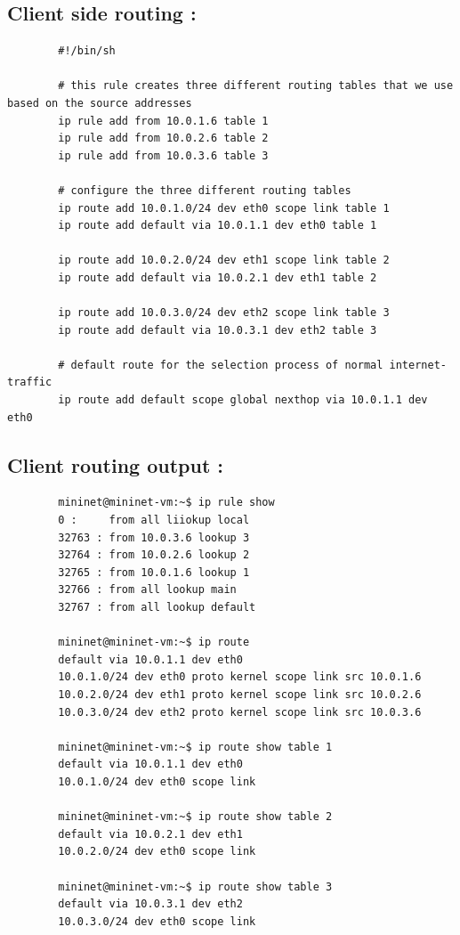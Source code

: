 \documentclass[a4paper,11pt]{article}
\begin{document}
	 	\subsection{Client side routing :}
	 	\label{subsec:clientroute}
	 	\begin{lstlisting}
	 	#!/bin/sh

	 	# this rule creates three different routing tables that we use based on the source addresses
	 	ip rule add from 10.0.1.6 table 1
	 	ip rule add from 10.0.2.6 table 2
	 	ip rule add from 10.0.3.6 table 3

	 	# configure the three different routing tables
	 	ip route add 10.0.1.0/24 dev eth0 scope link table 1
	 	ip route add default via 10.0.1.1 dev eth0 table 1

	 	ip route add 10.0.2.0/24 dev eth1 scope link table 2
	 	ip route add default via 10.0.2.1 dev eth1 table 2

	 	ip route add 10.0.3.0/24 dev eth2 scope link table 3
	 	ip route add default via 10.0.3.1 dev eth2 table 3

	 	# default route for the selection process of normal internet-traffic
	 	ip route add default scope global nexthop via 10.0.1.1 dev eth0
	 	\end{lstlisting}

	 	\subsection{Client routing output :}
	 	\label{subsec:clientrouteout}
	 	\begin{lstlisting}
	 	mininet@mininet-vm:~$ ip rule show
	 	0 : 	from all liiokup local
	 	32763 : from 10.0.3.6 lookup 3
	 	32764 : from 10.0.2.6 lookup 2
	 	32765 : from 10.0.1.6 lookup 1
	 	32766 : from all lookup main
	 	32767 : from all lookup default

	 	mininet@mininet-vm:~$ ip route
	 	default via 10.0.1.1 dev eth0
	 	10.0.1.0/24 dev eth0 proto kernel scope link src 10.0.1.6
	 	10.0.2.0/24 dev eth1 proto kernel scope link src 10.0.2.6
	 	10.0.3.0/24 dev eth2 proto kernel scope link src 10.0.3.6

	 	mininet@mininet-vm:~$ ip route show table 1
	 	default via 10.0.1.1 dev eth0
	 	10.0.1.0/24 dev eth0 scope link

	 	mininet@mininet-vm:~$ ip route show table 2
	 	default via 10.0.2.1 dev eth1
	 	10.0.2.0/24 dev eth0 scope link

	 	mininet@mininet-vm:~$ ip route show table 3
	 	default via 10.0.3.1 dev eth2
	 	10.0.3.0/24 dev eth0 scope link
	 	\end{lstlisting}
\end{document}
